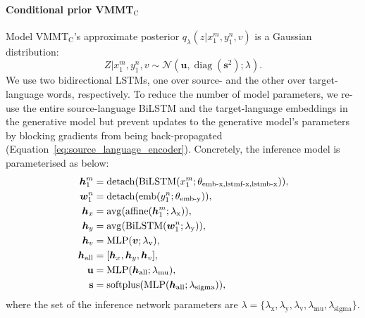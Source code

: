 \documentclass[11pt,a4paper]{article}
\DeclareMathOperator{\avg}{avg}
\DeclareMathOperator{\softplus}{softplus}
\DeclareMathOperator{\diag}{diag}
\DeclareMathOperator{\affine}{affine}
\DeclareMathOperator{\emb}{emb}
\DeclareMathOperator{\detach}{detach}
\DeclareMathOperator{\BiLSTM}{BiLSTM}
\DeclareMathOperator{\MLP}{MLP}
\newcommand{\cond}{VMMT$_{\text{C}}$\xspace}
\begin{document}
\paragraph{Conditional prior \cond}
Model \cond's approximate posterior $q_\lambda(z | x^m_1, y^n_1, v)$ is a Gaussian distribution:
\begin{equation*}
	Z | x_1^m, y_1^n, v \sim \mathcal N(\mathbf u, \diag(\mathbf s^2); \lambda).
\end{equation*}
We use two bidirectional LSTMs, one over source- and the other over target-language words, respectively. To reduce the number of model parameters, we re-use the entire source-language BiLSTM and the target-language embeddings in the generative model but prevent updates to the generative model's parameters by blocking gradients from being back-propagated (Equation~\ref{eq:source_language_encoder}).
Concretely, the inference model is parameterised as below:
\begin{align}
    \bm{h}_1^m &= \detach(\BiLSTM(x_1^m; \theta_\text{emb-x,lstmf-x,lstmb-x})), \notag\\
    \bm{w}_1^n &= \detach(\emb(y_1^n; \theta_\text{emb-y})), \notag\\
    \bm{h}_x &= \avg(\affine(\bm{h}_1^m; \lambda_\text{x})), \notag\\
    \bm{h}_y &= \avg(\BiLSTM(\bm{w}_1^n; \lambda_\text{y})), \notag\\
    \bm{h}_v &= \MLP(\bm{v}; \lambda_\text{v}), \notag\\
    \bm{h}_\text{all} &= [\bm{h}_x, \bm{h}_y, \bm{h}_v], \notag\\
    \mathbf u &= \MLP(\bm{h}_\text{all}; \lambda_\text{mu}), \notag\\
    \mathbf s &= \softplus(\MLP(\bm{h}_\text{all}; \lambda_\text{sigma})), \notag
\end{align}
where the set of the inference network parameters are $\lambda = \{ \lambda_\text{x}, \lambda_\text{y}, \lambda_\text{v}, \lambda_\text{mu}, \lambda_\text{sigma} \}$.
\end{document}
